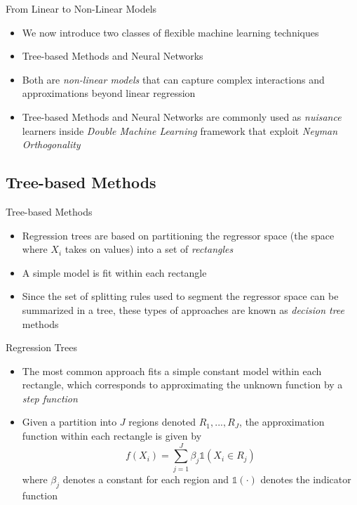 \documentclass[aspectratio=1610,12pt,xcolor=dvipsnames]{beamer}
\begin{document}
\begin{frame}{From Linear to Non-Linear Models}

\begin{itemize}
    \item We now introduce two classes of flexible machine learning techniques
    \item Tree-based Methods and Neural Networks
    \item Both are \textit{non-linear models} that can capture complex interactions and approximations beyond linear regression
    \item Tree-based Methods and Neural Networks are commonly used as \textit{nuisance} learners inside \textit{Double Machine Learning} framework that exploit \textit{Neyman Orthogonality}
\end{itemize}
\end{frame}

\subsection{Tree-based Methods}

\begin{frame}
  \subsectionpage
\end{frame}

\begin{frame}{Tree-based Methods}

\begin{itemize}
    \item Regression trees are based on partitioning the regressor space (the space where $X_i$ takes on values) into a set of \textit{rectangles}
    \item A simple model is fit within each rectangle
    \item Since the set of splitting rules used to segment the regressor space can be summarized in a tree, these types of approaches are known as \textit{decision tree} methods
\end{itemize}
\end{frame}

\begin{frame}{Regression Trees}

\begin{itemize}
    \item The most common approach fits a simple constant model within each rectangle, which corresponds to approximating the unknown function by a \textit{step function}
    \item Given a partition into $J$ regions denoted $R_1,...,R_J$, the approximation function within each rectangle is given by
    \[
    f(X_i) = \sum_{j=1}^J \beta_j \mathds{1} (X_i \in R_j)
    \]
    where $\beta_j$ denotes a constant for each region and $\mathds{1} (\cdot)$ denotes the indicator function
\end{itemize}
\end{frame}
\end{document}
